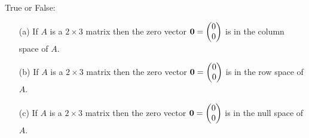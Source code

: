 \begin{problem}
    True or False:
    \begin{itemize}
        \item[(a)] If $A$ is a $2 \times 3$ matrix then the zero vector ${\bf 0} = \begin{pmatrix} 0\\0
            \end{pmatrix}$ is in the column space of $A$.
        \item[(b)] If $A$ is a $2 \times 3$ matrix then the zero vector ${\bf 0} = \begin{pmatrix} 0\\0
            \end{pmatrix}$ is in the row space of $A$.
        \item[(c)] If $A$ is a $2 \times 3$ matrix then the zero vector ${\bf 0} = \begin{pmatrix} 0\\0
            \end{pmatrix}$ is in the null space of $A$.
    \end{itemize}
\end{problem}

